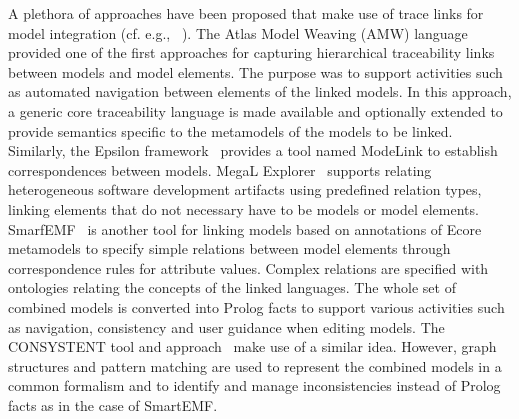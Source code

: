 A plethora of approaches have been proposed that make use of trace links for model integration (cf. e.g.,
\cite{amw-website,epsilon-website,Favre:2012:MLA:2404962.2404978,LH09,HerzigProcCS2014,SimkoASME2012,BoddyAVICPS2011}~\cite{mote-website}). The Atlas Model Weaving (AMW) language~\cite{amw-website} provided one of the first approaches for capturing hierarchical traceability links between models and model elements.
The purpose was to support activities such as automated navigation between
elements of the linked models. In this approach, a generic core traceability language is made available and optionally extended to provide semantics specific to the metamodels of the models to be linked. Similarly, the Epsilon framework~\cite{epsilon-website} provides a tool named ModeLink to establish correspondences between models. MegaL Explorer~\cite{Favre:2012:MLA:2404962.2404978} supports relating heterogeneous software development artifacts using predefined relation types, linking elements that do not necessary have to be models or model elements. 
%
%
SmarfEMF~\cite{LH09} is another tool for linking models based on annotations of Ecore metamodels to specify simple relations between model elements through correspondence rules for attribute values. Complex relations are specified with ontologies relating the concepts of the linked languages. The whole set of combined models is converted into Prolog facts to support various activities such as navigation, consistency and user guidance when editing models. The CONSYSTENT tool and approach~\cite{HerzigProcCS2014} make use of a similar idea. However, graph structures and pattern matching are used to represent the  combined models in a common formalism and to identify and manage inconsistencies instead of Prolog facts as in the case of SmartEMF.

